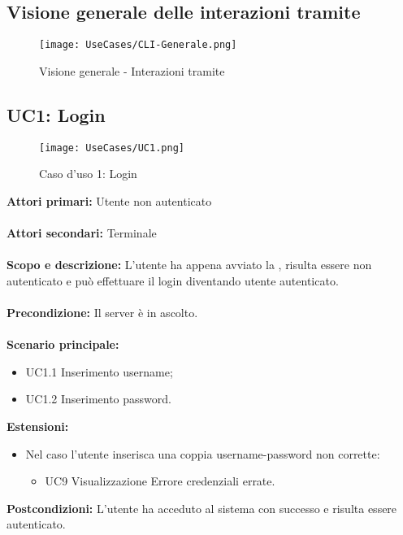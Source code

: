 \documentclass{scalatekids-article}
\begin{document}
\subsection{Visione generale delle interazioni tramite }
\begin{figure}[H]
  \begin{center}
    \texttt{[image: UseCases/CLI-Generale.png]}
    \caption*{Visione generale - Interazioni tramite }
  \end{center}
\end{figure}

\subsection{UC1: Login}

\begin{figure}[H]
  \begin{center}
    \texttt{[image: UseCases/UC1.png]}
    \caption*{Caso d'uso 1: Login}
  \end{center}
\end{figure}
\textbf{Attori primari:} Utente non autenticato\\ \\
\textbf{Attori secondari:} Terminale\\ \\
\textbf{Scopo e descrizione:}
L’utente ha appena avviato la , risulta essere non autenticato e può effettuare il login diventando utente
autenticato.\\ \\
\textbf{Precondizione:} Il server è in ascolto.\\ \\
\textbf{Scenario principale:}
\begin{itemize}
\item UC1.1 Inserimento username;
\item UC1.2 Inserimento password.
\end{itemize}
\textbf{Estensioni:}
\begin{itemize}
\item Nel caso l'utente inserisca una coppia username-password non corrette:
  \begin{itemize}
  \item UC9 Visualizzazione Errore credenziali errate.
  \end{itemize}
\end{itemize}
\textbf{Postcondizioni:} L'utente ha acceduto al sistema con successo e risulta essere autenticato.
\end{document}
